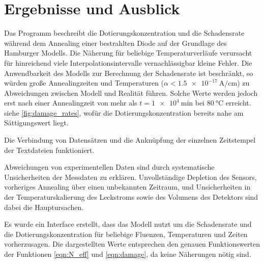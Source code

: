 \chapter{Ergebnisse und Ausblick}
Das Programm beschreibt die Dotierungskonzentration und die Schadensrate während dem
Annealing einer bestrahlten Diode
auf der Grundlage des Hamburger Modells. Die Näherung für beliebige
Temperaturverläufe verursacht für hinreichend viele Interpolationsintervalle
vernachlässigbar kleine Fehler. Die Anwendbarkeit des Modells zur Berechnung der Schadensrate ist
beschränkt, so würden große Annealingzeiten und Temperaturen ($\alpha < \SI{1.5e-17}{\ampere\per\centi\meter}$) zu Abweichungen
zwischen Modell und Realität führen. Solche Werte werden jedoch erst nach
einer Annealingzeit von mehr als $t=\SI{1e4}{\minute}$ bei $\SI{80}{\celsius}$ erreicht. siehe
\ref{fig:damage_rates}, wofür
die Dotierungskonzentration bereits nahe am Sättigungswert liegt.

Die Verbindung von Datensätzen und die Anknüpfung der einzelnen Zeitstempel der
Textdateien funktioniert.

Abweichungen von experimentellen Daten sind durch systematische Unsicherheiten der Messdaten
zu erklären. Unvollständige Depletion des Sensors, vorheriges Annealing über einen
unbekannten Zeitraum, und Unsicherheiten in der Temperaturskalierung des Leckstroms sowie
des Volumens des Detektors sind dabei die Hauptursachen.

Es wurde ein Interface erstellt, dass das Modell nutzt um die Schadensrate und die Dotierungskonzentration
für beliebige Fluenzen, Temperaturen und
Zeiten vorherzusagen. Die dargestellten Werte entsprechen den genauen Funktionswerten
der Funktionen \ref{eqn:N_eff} und \ref{eqn:damage}, da keine Näherungen nötig sind.

